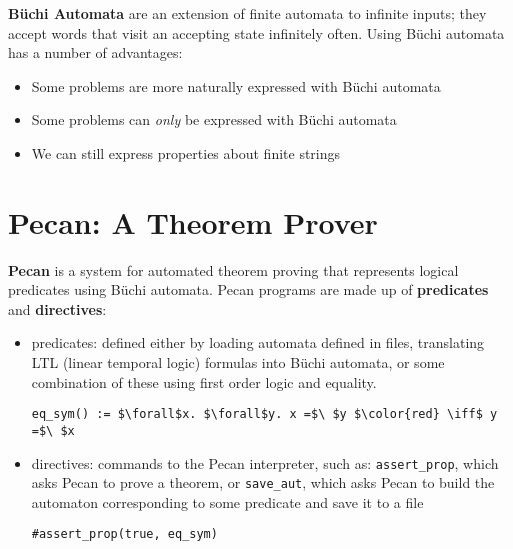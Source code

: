 \documentclass[landscape,usenames,dvipsnames]{sciposter}
\begin{document}
\begin{multicols}{3}
\textbf{B\"uchi Automata} are an extension of finite automata to infinite inputs; they accept words that visit an accepting state infinitely often. 
Using B\"uchi automata has a number of advantages:
\begin{itemize}
        \item Some problems are more naturally expressed with B\"uchi automata
        \item Some problems can \emph{only} be expressed with B\"uchi automata
        \item We can still express properties about finite strings
\end{itemize}

\columnbreak

\section*{Pecan: A Theorem Prover}

\textbf{Pecan} is a system for automated theorem proving that represents logical predicates using B\"uchi automata.
Pecan programs are made up of \textbf{predicates} and \textbf{directives}:

\begin{itemize}
    \item predicates: defined either by loading automata defined in files, translating LTL (linear temporal logic) formulas into B\"uchi automata, or some combination of these using first order logic and equality.

\begin{lstlisting}[language=pecan, basicstyle=\normalsize\ttfamily, mathescape=true, frame=single]
eq_sym() := $\forall$x. $\forall$y. x =$\ $y $\color{red} \iff$ y =$\ $x
\end{lstlisting}

    \item directives: commands to the Pecan interpreter, such as: \texttt{assert\_prop}, which asks Pecan to prove a theorem, or \texttt{save\_aut}, which asks Pecan to build the automaton corresponding to some predicate and save it to a file
    
\begin{lstlisting}[language=pecan, basicstyle=\normalsize\ttfamily, mathescape=true, frame=single]
#assert_prop(true, eq_sym)
\end{lstlisting}


\end{itemize}
\end{multicols}
\end{document}
